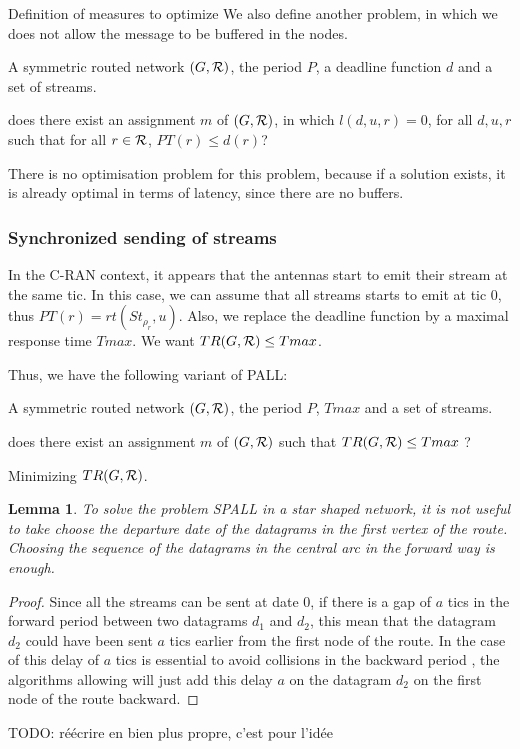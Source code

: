 \documentclass[10pt]{article}
\newtheorem{lemma}[theorem]{Lemma}
\newcommand{\todo}[1]{{\color{red} TODO: {#1}}}
\newcommand\pall{\textsc{PALL}\xspace}
\newcommand\spall{\textsc{SPALL}\xspace}
\begin{document}
\begin{subsection}{Definition of measures to optimize}
       We also define another problem, in which we does not allow the message to be buffered in the nodes.\\

        A symmetric routed network $(G,{\cal R})$, the period $P$, a deadline function $d$ and a set of streams.
      
       does there exist an assignment $m$ of $(G,{\cal R})$, in which $l(d,u,r) = 0$, for all $d,u,r$ such that for all $r \in {\cal R}$, $PT(r) \leq d(r)$?
      
    There is no optimisation problem for this problem, because if a solution exists, it is already optimal in terms of latency, since there are no buffers.


        \subsubsection{Synchronized sending of streams}
     
        In the C-RAN context, it appears that the antennas start to emit their stream at the same tic.
        In this case, we can assume that all streams starts to emit at tic $0$, thus $PT(r)= rt(St_{\rho_r},u)$.
        Also, we replace the deadline function by a maximal response time $Tmax$. We want $TR(G,{\cal R}) \leq Tmax$.
        
         Thus, we have the following variant of \pall:
       
       \noindent {\bf Periodic Assignment for Low Latency (\spall)} 

        A symmetric routed network $(G,{\cal R})$, the period $P$, $Tmax$ and a set of streams.
      
       does there exist an assignment $m$ of $(G,{\cal R})$ such that $ TR(G,{\cal R}) \leq Tmax$ ?

       Minimizing $TR(G,{\cal R})$.
    
     
    \begin{lemma}
   
    To solve the problem \spall in a star shaped network, it is not useful to take choose the departure date of the datagrams in the first vertex of the route. Choosing the sequence of the datagrams in the central arc in the forward way is enough.
     \label{lemma:spallorder}
     \end{lemma}
   \begin{proof}
    Since all the streams can be sent at date $0$, if there is a gap of $a$ tics in the forward period between two datagrams $d_1$ and $d_2$, this mean that the datagram $d_2$ could have been sent $a$ tics earlier from the first node of the route. In the case of this delay of $a$ tics is essential to avoid collisions in the backward period , the algorithms allowing will just add this delay $a$ on the datagram $d_2$ on the first node of the route backward.
   \end{proof}
\todo{réécrire en bien plus propre, c'est pour l'idée}
      

\end{subsection}
\end{document}
